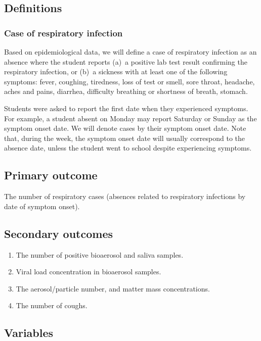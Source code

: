 \documentclass{article}
\begin{document}
\subsection{Definitions}

\subsubsection{Case of respiratory infection}

Based on epidemiological data, we will define a case of respiratory infection as an absence where the student reports (a)~a positive lab test result confirming the respiratory infection, or (b)~a sickness with at least one of the following symptoms: fever, coughing, tiredness, loss of test or smell, sore throat, headache, aches and pains, diarrhea, difficulty breathing or shortness of breath, stomach. 

Students were asked to report the first date when they experienced symptoms. For example, a student absent on Monday may report Saturday or Sunday as the symptom onset date. We will denote cases by their symptom onset date. Note that, during the week, the symptom onset date will usually correspond to the absence date, unless the student went to school despite experiencing symptoms.  

\subsection{Primary outcome}

The number of respiratory cases (absences related to respiratory infections by date of symptom onset).  


\subsection{Secondary outcomes}

\begin{enumerate}
    \item The number of positive bioaerosol and saliva samples.
    \item Viral load concentration in bioaerosol samples.
    \item The aerosol/particle number, and matter mass concentrations.
    \item The number of coughs.
\end{enumerate}

\subsection{Variables}
\end{document}
